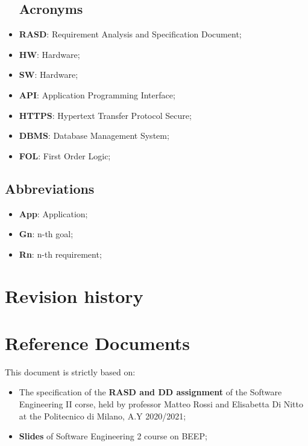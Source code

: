 \begin{itemize}
\subsection{Acronyms}
\item \textbf{RASD}: Requirement Analysis and Specification Document;
\item \textbf{HW}: Hardware;
\item \textbf{SW}: Hardware;
\item \textbf{API}: Application Programming Interface;
\item \textbf{HTTPS}: Hypertext Transfer Protocol Secure;
\item \textbf{DBMS}: Database Management System;
\item \textbf{FOL}: First Order Logic;


\end{itemize}




\subsection{Abbreviations}
\begin{itemize}
\item \textbf{App}: Application;
\item \textbf{Gn}: n-th goal;
\item \textbf{Rn}: n-th requirement;
\end{itemize}



\section{Revision history}



\section{Reference Documents}
This document is strictly based on:
\begin{itemize}
\item The specification of the \textbf{RASD and DD assignment} of the Software Engineering II corse, held by professor Matteo Rossi and Elisabetta Di Nitto at the Politecnico di Milano, A.Y 2020/2021;
\item \textbf{Slides} of Software Engineering 2 course on BEEP;
\end{itemize}
